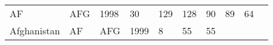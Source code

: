 \documentclass[]{article}
\begin{document}
\begin{longtable}[]{@{}llllllllll@{}}
\begin{minipage}[t]{0.04\columnwidth}
AF\strut
\end{minipage} & \begin{minipage}[t]{0.04\columnwidth}\raggedright\strut
AFG\strut
\end{minipage} & \begin{minipage}[t]{0.04\columnwidth}\raggedright\strut
1998\strut
\end{minipage} & \begin{minipage}[t]{0.08\columnwidth}\raggedright\strut
30\strut
\end{minipage} & \begin{minipage}[t]{0.09\columnwidth}\raggedright\strut
129\strut
\end{minipage} & \begin{minipage}[t]{0.09\columnwidth}\raggedright\strut
128\strut
\end{minipage} & \begin{minipage}[t]{0.09\columnwidth}\raggedright\strut
90\strut
\end{minipage} & \begin{minipage}[t]{0.09\columnwidth}\raggedright\strut
89\strut
\end{minipage} & \begin{minipage}[t]{0.09\columnwidth}\raggedright\strut
64\strut
\end{minipage}\tabularnewline
\begin{minipage}[t]{0.08\columnwidth}\raggedright\strut
Afghanistan\strut
\end{minipage} & \begin{minipage}[t]{0.04\columnwidth}\raggedright\strut
AF\strut
\end{minipage} & \begin{minipage}[t]{0.04\columnwidth}\raggedright\strut
AFG\strut
\end{minipage} & \begin{minipage}[t]{0.04\columnwidth}\raggedright\strut
1999\strut
\end{minipage} & \begin{minipage}[t]{0.08\columnwidth}\raggedright\strut
8\strut
\end{minipage} & \begin{minipage}[t]{0.09\columnwidth}\raggedright\strut
55\strut
\end{minipage} & \begin{minipage}[t]{0.09\columnwidth}\raggedright\strut
55\strut
\end{minipage} & \begin{minipage}[t]{0.09\columnwidth}\raggedright\strut

\end{minipage}
\end{longtable}
\end{document}
